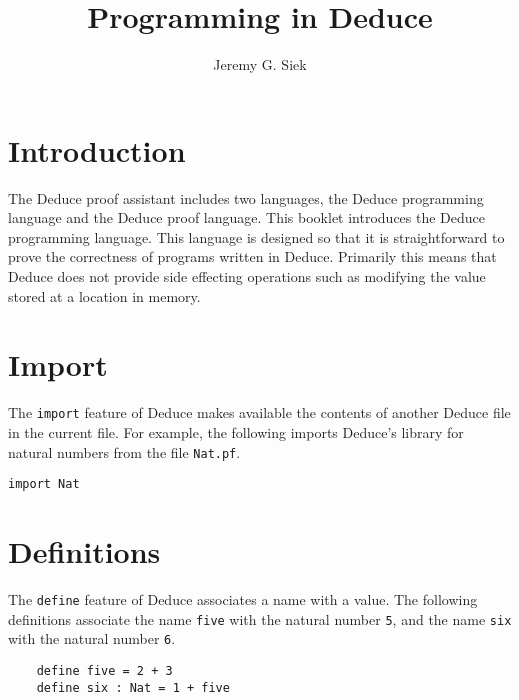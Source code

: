 \documentclass[12pt]{article}
\title{Programming in Deduce}
\author{Jeremy G. Siek}
\newif\ifBorder
\begin{document}

\Bordertrue

\maketitle


\tableofcontents

\pagebreak

\large

\section{Introduction}

The Deduce proof assistant includes two languages, the Deduce
programming language and the Deduce proof language. This booklet
introduces the Deduce programming language. This language is designed
so that it is straightforward to prove the correctness of programs
written in Deduce. Primarily this means that Deduce does not provide
side effecting operations such as modifying the value stored at a
location in memory.

\section{Import}

The \texttt{import} feature of Deduce makes available the contents of
another Deduce file in the current file. For example, the following
imports Deduce's library for natural numbers from the file
\texttt{Nat.pf}.

\begin{verbatim}
import Nat
\end{verbatim}

\section{Definitions}

The \texttt{define} feature of Deduce associates a name with a value.
The following definitions associate the name \texttt{five} with the
natural number \texttt{5}, and the name \texttt{six} with the natural
number \texttt{6}.

\begin{verbatim}
    define five = 2 + 3
    define six : Nat = 1 + five
\end{verbatim}
\end{document}

